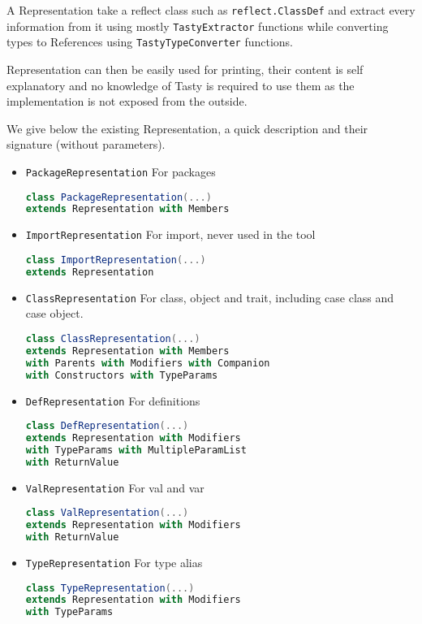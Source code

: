 \documentclass{report}
\begin{document}
A Representation take a reflect class such as \texttt{reflect.ClassDef} and extract every information from it using mostly \texttt{TastyExtractor} functions while converting types to References using \texttt{TastyTypeConverter} functions.

Representation can then be easily used for printing, their content is self explanatory and no knowledge of Tasty is required to use them as the implementation is not exposed from the outside.

We give below the existing Representation, a quick description and their signature (without parameters).
\begin{itemize}
    \item \texttt{PackageRepresentation} For packages
\begin{lstlisting}[language=scala]
class PackageRepresentation(...)
extends Representation with Members
\end{lstlisting}
    \item \texttt{ImportRepresentation} For import, never used in the tool
\begin{lstlisting}[language=scala]
class ImportRepresentation(...)
extends Representation
\end{lstlisting}
    \item \texttt{ClassRepresentation} For class, object and trait, including case class and case object.
\begin{lstlisting}[language=scala]
class ClassRepresentation(...)
extends Representation with Members
with Parents with Modifiers with Companion
with Constructors with TypeParams
\end{lstlisting}
    \item \texttt{DefRepresentation} For definitions
\begin{lstlisting}[language=scala]
class DefRepresentation(...)
extends Representation with Modifiers
with TypeParams with MultipleParamList
with ReturnValue
\end{lstlisting}
    \item \texttt{ValRepresentation} For val and var
\begin{lstlisting}[language=scala]
class ValRepresentation(...)
extends Representation with Modifiers
with ReturnValue
\end{lstlisting}
    \item \texttt{TypeRepresentation} For type alias
\begin{lstlisting}[language=scala]
class TypeRepresentation(...)
extends Representation with Modifiers
with TypeParams 

\end{lstlisting}
\end{itemize}
\end{document}
